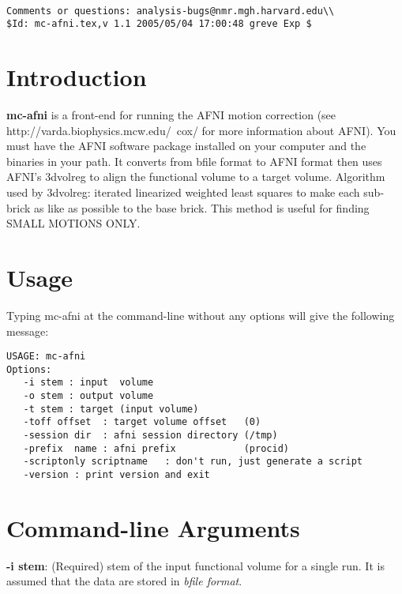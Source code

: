 \documentclass[10pt]{article}
\begin{document}
\begin{Large}
 \\
\end{Large}

\noindent 
\begin{verbatim}
Comments or questions: analysis-bugs@nmr.mgh.harvard.edu\\
$Id: mc-afni.tex,v 1.1 2005/05/04 17:00:48 greve Exp $
\end{verbatim}

\section{Introduction}
{\bf mc-afni} is a front-end for running the AFNI motion correction
(see http://varda.biophysics.mcw.edu/~cox/ for more information about
AFNI). You must have the AFNI software package installed on your
computer and the binaries in your path.  It converts from bfile format
to AFNI format then uses AFNI's 3dvolreg to align the functional
volume to a target volume.  Algorithm used by 3dvolreg: iterated
linearized weighted least squares to make each sub-brick as like as
possible to the base brick.  This method is useful for finding SMALL
MOTIONS ONLY.  \\

\section{Usage}
Typing mc-afni at the command-line without any options will give the
following message:\\ 

\begin{small}
\begin{verbatim}
USAGE: mc-afni
Options:
   -i stem : input  volume 
   -o stem : output volume 
   -t stem : target (input volume)
   -toff offset  : target volume offset   (0)
   -session dir  : afni session directory (/tmp)
   -prefix  name : afni prefix            (procid)
   -scriptonly scriptname   : don't run, just generate a script
   -version : print version and exit
\end{verbatim}
\end{small}

\section{Command-line Arguments}

\noindent
{\bf -i stem}: (Required) stem of the input functional volume for a single run.
It is assumed that the data are stored in {\em bfile format}. \\
\end{document}
